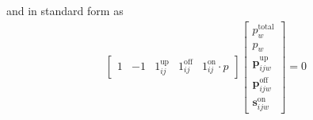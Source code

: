 and in standard form as
\begin{equation} \begin{aligned}
	\begin{bmatrix}1 & -1 & 1_{ij}^{\text{up}} & 1_{ij}^{\text{off}} & 1_{ij}^{\text{on}}\cdot p  \end{bmatrix}\begin{bmatrix} p^{\text{total}}_w \\ p_w \\ \mathbf{p}_{ijw}^{\text{up}} \\ \mathbf{p}_{ijw}^{\text{off}} \\ \mathbf{s}_{ijw}^{\text{on}}\end{bmatrix} = 0
\end{aligned} \end{equation}

